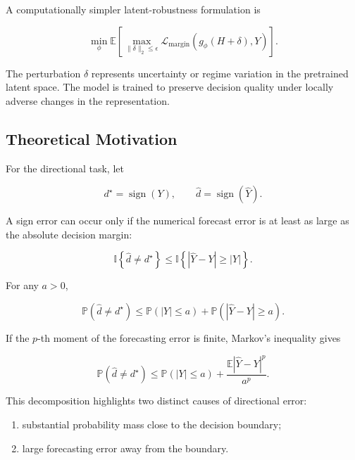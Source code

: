\documentclass[11pt]{article}
\newcommand{\Prob}{\mathbb{P}}
\newcommand{\E}{\mathbb{E}}
\newcommand{\ind}{\mathbb{I}}
\begin{document}
A computationally simpler latent-robustness formulation is

\begin{equation}
\min_{\phi}
\E
\left[
\max_{\|\delta\|_2\leq\epsilon}
\mathcal{L}_{\mathrm{margin}}
\left(
g_\phi(H+\delta),Y
\right)
\right].
\end{equation}

The perturbation $\delta$ represents uncertainty or regime variation in the
pretrained latent space. The model is trained to preserve decision quality
under locally adverse changes in the representation.

\subsection{Theoretical Motivation}

For the directional task, let

\begin{equation}
d^\star
=
\operatorname{sign}(Y),
\qquad
\widehat d
=
\operatorname{sign}(\widehat Y).
\end{equation}

A sign error can occur only if the numerical forecast error is at least as
large as the absolute decision margin:

\begin{equation}
\ind
\left\{
\widehat d\neq d^\star
\right\}
\leq
\ind
\left\{
|\widehat Y-Y|
\geq
|Y|
\right\}.
\end{equation}

For any $a>0$,

\begin{equation}
\Prob
\left(
\widehat d\neq d^\star
\right)
\leq
\Prob(|Y|\leq a)
+
\Prob
\left(
|\widehat Y-Y|\geq a
\right).
\end{equation}

If the $p$-th moment of the forecasting error is finite, Markov's inequality
gives

\begin{equation}
\Prob
\left(
\widehat d\neq d^\star
\right)
\leq
\Prob(|Y|\leq a)
+
\frac{
\E|\widehat Y-Y|^p
}{
a^p
}.
\end{equation}

This decomposition highlights two distinct causes of directional error:

\begin{enumerate}
    \item substantial probability mass close to the decision boundary;
    \item large forecasting error away from the boundary.
\end{enumerate}
\end{document}
